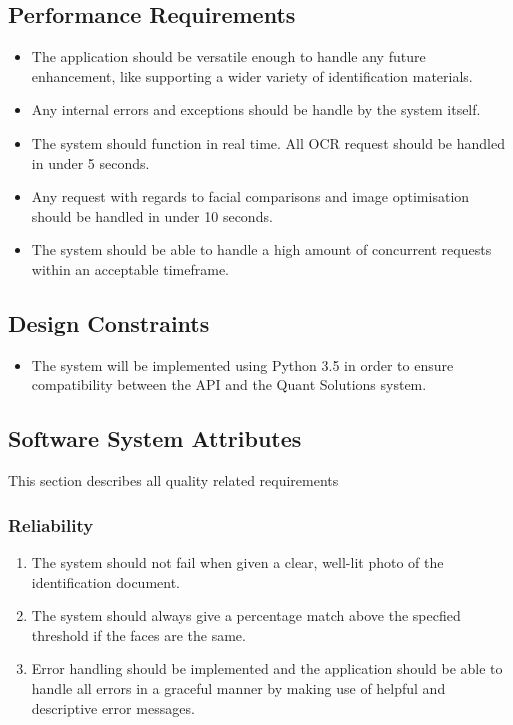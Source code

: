\documentclass{article}
\begin{document}
		\subsection{Performance Requirements}\label{subsec:specific-performance}
		\begin{itemize}
		    \item The application should be versatile enough to handle any future enhancement, like supporting a wider variety of identification materials.
		    \item Any internal errors and exceptions should be handle by the system itself.
		    \item The system should function in real time. All OCR request should be handled in under 5 seconds.
		    \item Any request with regards to facial comparisons and image optimisation should be handled in under 10 seconds.
		    \item The system should be able to handle a high amount of concurrent requests within an acceptable timeframe.
		\end{itemize}

		\subsection{Design Constraints}\label{subsec:specific-constraints}
		\begin{itemize}
		    \item The system will be implemented using Python 3.5 in order to ensure compatibility between the API and the Quant Solutions system.
		\end{itemize}			

		\subsection{Software System Attributes}\label{subsec:specific-software}
		This section describes all quality related requirements
		\subsubsection{Reliability}
		\begin{enumerate}
		    \item The system should not fail when given a clear, well-lit photo of the identification document.
		    \item The system should always give a percentage match above the specfied threshold if the faces are the same.
		    \item Error handling should be implemented and the application should be able to handle all errors in a graceful manner by making use of helpful and descriptive error messages.
		\end{enumerate}
\end{document}
